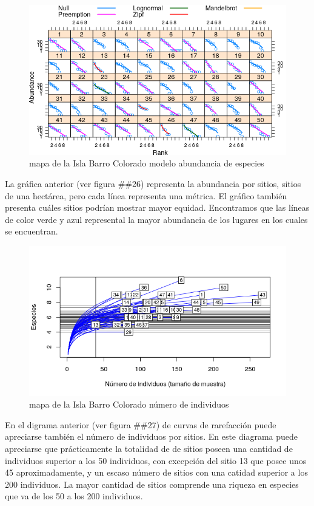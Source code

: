 \documentclass[11pt,]{article}
\begin{document}
\begin{figure}
\centering
\includegraphics[width=1.00000\textwidth]{modelo_abundancia_especie.png}
\caption{mapa de la Isla Barro Colorado modelo abundancia de especies
\label{fig:bci_map}}
\end{figure}

La gráfica anterior (ver figura \#\#26) representa la abundancia por
sitios, sitios de una hectárea, pero cada línea representa una métrica.
El gráfico también presenta cuáles sitios podrían mostrar mayor equidad.
Encontramos que las líneas de color verde y azul represental la mayor
abundancia de los lugares en los cuales se encuentran.

\begin{figure}
\centering
\includegraphics[width=1.00000\textwidth]{Numero_individuos.png}
\caption{mapa de la Isla Barro Colorado número de individuos
\label{fig:bci_map}}
\end{figure}

En el digrama anterior (ver figura \#\#27) de curvas de rarefacción
puede apreciarse también el número de individuos por sitios. En este
diagrama puede apreciarse que prácticamente la totalidad de de sitios
poseen una cantidad de individuos superior a los 50 individuos, con
excepción del sitio 13 que posee unos 45 aproximadamente, y un escaso
número de sitios con una catidad superior a los 200 individuos. La mayor
cantidad de sitios comprende una riqueza en especies que va de los 50 a
los 200 individuos.
\end{document}
